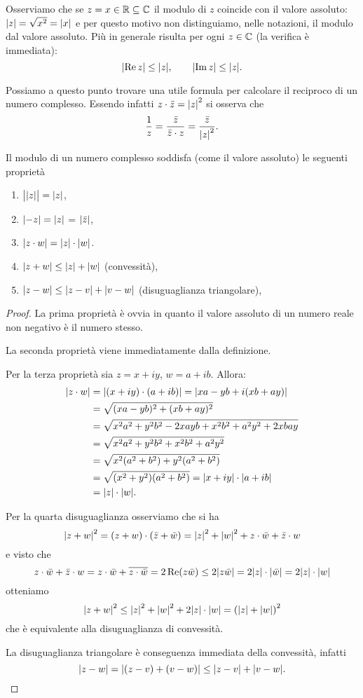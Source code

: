 Osserviamo che se $z = x \in {\mathbb R} \subseteq {\mathbb C}$ il modulo di $z$ coincide
con il valore assoluto: ${\left|z\right|} = \sqrt{x^2} = {\left|x\right|}$ e per questo
motivo non distinguiamo, nelle notazioni, il modulo dal valore assoluto.
Più in generale risulta per ogni $z\in {\mathbb C}$ (la verifica è immediata):
\[
  {\left|\operatorname{Re} z\right|} \le {\left|z\right|}, \qquad
  {\left|\operatorname{Im}z\right|} \le {\left|z\right|}.
\]

Possiamo a questo punto trovare una utile formula per calcolare
il reciproco di un numero complesso. Essendo infatti
$z\cdot \bar z = {\left|z\right|}^2$ si osserva che
\[
  \frac{1}{z}
  = \frac{\bar z}{ \bar z \cdot z}
  = \frac{\bar z}{{\left|z\right|}^2}.
\]

\begin{theorem}
Il modulo di un numero complesso soddisfa (come il valore assoluto)
le seguenti proprietà
\begin{enumerate}
\item $\big\lvert{\left|z\right|}\big\rvert = {\left|z\right|}$,
\item ${\left|-z\right|} = {\left|z\right|}$ = ${\left|\bar z\right|}$,
\item ${\left|z\cdot w\right|} = {\left|z\right|}\cdot{\left|w\right|}$.
\item ${\left|z+w\right|} \le {\left|z\right|}+{\left|w\right|}$ (convessità),
\item ${\left|z-w\right|} \le {\left|z-v\right|} + {\left|v-w\right|}$ (disuguaglianza triangolare),
\end{enumerate}
\end{theorem}
%
\begin{proof}
La prima proprietà è ovvia in quanto il valore assoluto di un numero reale
non negativo è il numero stesso.

La seconda proprietà viene immediatamente dalla definizione.

Per la terza proprietà sia $z=x+iy$, $w=a+ib$.
Allora:
\begin{align*}
{\left|z\cdot w\right|}
&= {\left|(x+iy)\cdot(a+ib)\right|}
={\left|xa - y b+ i(xb + ay)\right|} \\
&= \sqrt{(xa-yb)^2 + (xb+ay)^2}\\
&=\sqrt{x^2 a^2 + y^2b^2 - 2xayb + x^2b^2+a^2y^2+2xbay} \\
&=\sqrt{x^2 a^2 + y^2 b^2 + x^2 b^2 + a^2 y^2}\\
&=\sqrt{x^2(a^2+b^2) + y^2(a^2+b^2)}\\
&=\sqrt{(x^2+y^2)(a^2+b^2)}
={\left|x+iy\right|} \cdot {\left|a+ib\right|}\\
&={\left|z\right|}\cdot{\left|w\right|}.
\end{align*}

Per la quarta disuguaglianza osserviamo che si ha
\[
  {\left|z+w\right|}^2 = (z+w)\cdot(\bar z + \bar w)
  = {\left|z\right|}^2 + {\left|w\right|}^2 + z\cdot \bar w + \bar z \cdot w
\]
e visto che
\[
  z\cdot \bar w + \bar z \cdot w
  = z \cdot \bar w + \overline{z \cdot \bar w}
  = 2 \operatorname{Re}(z\bar w)
  \le 2 {\left|z\bar w\right|}
  = 2 {\left|z\right|}\cdot{\left|\bar w\right|}
  = 2 {\left|z\right|}\cdot{\left|w\right|}
\]
otteniamo
\[
 {\left|z+w\right|}^2 \le {\left|z\right|}^2+{\left|w\right|}^2 + 2 {\left|z\right|}\cdot{\left|w\right|}
 ={\left( {\left|z\right|} + {\left|w\right|} \right)}^2
\]
che è equivalente alla disuguaglianza di convessità.

La disuguaglianza triangolare è conseguenza immediata della convessità, infatti
\[
  {\left|z-w\right|} = {\left|(z-v) + (v-w)\right|}
  \le {\left|z-v\right|} + {\left|v-w\right|}.
\]
\end{proof}

